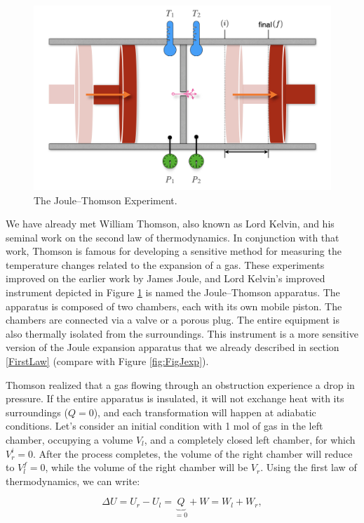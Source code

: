 \documentclass[
  9pt,
]{extbook}
\theoremstyle{definition}
\theoremstyle{definition}
\theoremstyle{definition}
\theoremstyle{remark}
\begin{document}
\begin{figure}

{\centering \includegraphics[width=0.8\linewidth]{./img/OEP_Figures.015} 

}

\caption{The Joule–Thomson Experiment.}\label{fig:FigJT}
\end{figure}

We have already met William Thomson, also known as Lord Kelvin, and his seminal work on the second law of thermodynamics. In conjunction with that work, Thomson is famous for developing a sensitive method for measuring the temperature changes related to the expansion of a gas. These experiments improved on the earlier work by James Joule, and Lord Kelvin's improved instrument depicted in Figure \ref{fig:FigJT} is named the Joule--Thomson apparatus. The apparatus is composed of two chambers, each with its own mobile piston. The chambers are connected via a valve or a porous plug. The entire equipment is also thermally isolated from the surroundings. This instrument is a more sensitive version of the Joule expansion apparatus that we already described in section \ref{FirstLaw} (compare with Figure \ref{fig:FigJexp}).

Thomson realized that a gas flowing through an obstruction experience a drop in pressure. If the entire apparatus is insulated, it will not exchange heat with its surroundings (\(Q=0\)), and each transformation will happen at adiabatic conditions. Let's consider an initial condition with 1 mol of gas in the left chamber, occupying a volume \(V_l\), and a completely closed left chamber, for which \(V_r^i=0\). After the process completes, the volume of the right chamber will reduce to \(V_l^f=0\), while the volume of the right chamber will be \(V_r\). Using the first law of thermodynamics, we can write:

\begin{equation}
\Delta U=U_r-U_l=\underbrace{Q}_{=0}+W=W_l+W_r,
\label{eq:JT1}
\end{equation}
\end{document}
